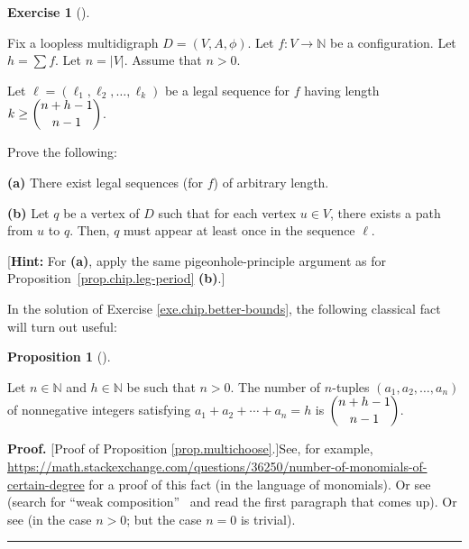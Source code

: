 \documentclass[numbers=enddot,12pt,final,onecolumn,notitlepage]{scrartcl}%
\newcounter{exer}
\theoremstyle{definition}
\newtheorem{prop}[theo]{Proposition}
\newenvironment{proposition}[1][]
{\begin{prop}[#1]\begin{leftbar}}
{\end{leftbar}\end{prop}}
\newtheorem{exmp}[exer]{Exercise}
\newenvironment{exercise}[1][]
{\begin{exmp}[#1]\begin{leftbar}}
{\end{leftbar}\end{exmp}}
\newenvironment{proof}[1][Proof]{\noindent\textbf{#1.} }{\ \rule{0.5em}{0.5em}}
\let\sumnonlimits\sum
\renewcommand{\sum}{\sumnonlimits\limits}
\newcommand{\NN}{\mathbb{N}}
\newcommand{\abs}[1]{\left| #1 \right|}
\newcommand{\tup}[1]{\left( #1 \right)}
\begin{document}
\begin{exercise} \label{exe.chip.better-bounds}
Fix a loopless multidigraph $D = \tup{V, A, \phi}$.
Let $f : V \to \NN$ be a configuration.
Let $h = \sum f$.
Let $n = \abs{V}$.
Assume that $n > 0$.

Let $\ell = \tup{\ell_1, \ell_2, \ldots, \ell_k}$ be a
legal sequence for $f$ having length
$k \geq \dbinom{n+h-1}{n-1}$.

Prove the following:

\textbf{(a)} There exist legal sequences (for $f$) of
arbitrary length.

\textbf{(b)} Let $q$ be a vertex of $D$ such that for each vertex
$u \in V$, there exists a path from $u$ to $q$.
Then, $q$ must appear at least once in the sequence $\ell$.

[\textbf{Hint:}
For \textbf{(a)}, apply the same pigeonhole-principle argument
as for Proposition~\ref{prop.chip.leg-period} \textbf{(b)}.]
\end{exercise}

In the solution of Exercise \ref{exe.chip.better-bounds}, the following
classical fact will turn out useful:

\begin{proposition}
\label{prop.multichoose}Let $n\in\mathbb{N}$ and $h\in\mathbb{N}$ be such that
$n>0$. The number of $n$-tuples $\left(  a_{1},a_{2},\ldots,a_{n}\right)  $ of
nonnegative integers satisfying $a_{1}+a_{2}+\cdots+a_{n}=h$ is $\dbinom
{n+h-1}{n-1}$.
\end{proposition}

\begin{proof}
[Proof of Proposition \ref{prop.multichoose}.]See, for example,
\url{https://math.stackexchange.com/questions/36250/number-of-monomials-of-certain-degree}
for a proof of this fact (in the language of monomials). Or see \cite[\S 1.2]%
{Stanle11} (search for \textquotedblleft weak composition\textquotedblright%
\ and read the first paragraph that comes up).
Or see \cite[Proposition 13.3]{Galvin} (in the case $n > 0$; but the case
$n = 0$ is trivial).
\end{proof}
\end{document}
